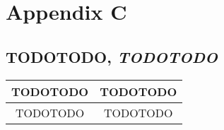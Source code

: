 %
%
%
\clearpage

\chapter{Appendix C}
\label{appendix:AppendixC}

\section{TODOTODO, \emph{TODOTODO}}
\label{appendix:APP_Adm}

\begin{xltabular}{\textwidth}{|c|c|}
\hline
\textbf{TODOTODO} & \textbf{TODOTODO} \\
\hline
TODOTODO & TODOTODO \\
\hline
\end{xltabular}
